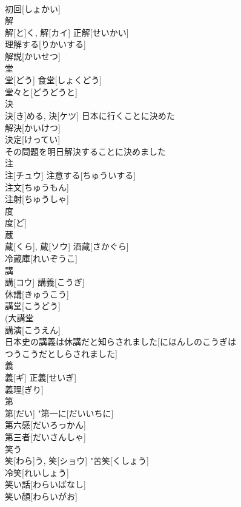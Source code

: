 \documentclass[8pt]{extreport}
\begin{document}
\begin{CJK}{UTF8}{min}
\\	初回[しょかい] 
\\	解	
\\	解[と]く, 解[カイ]	正解[せいかい] 
\\	理解する[りかいする] 
\\	解説[かいせつ] 
\\	堂	
\\	堂[どう]	食堂[しょくどう] 
\\	堂々と[どうどうと] 
\\	決	
\\	決[き]める, 決[ケツ]	日本に行くことに決めた 
\\	解決[かいけつ] 
\\	決定[けってい] 
\\	その問題を明日解決することに決めました 
\\	注	
\\	注[チュウ]	注意する[ちゅういする] 
\\	注文[ちゅうもん] 
\\	注射[ちゅうしゃ] 
\\	度	
\\	度[ど]	
\\	蔵	
\\	蔵[くら], 蔵[ソウ]	酒蔵[さかぐら] 
\\	冷蔵庫[れいぞうこ] 
\\	講	
\\	講[コウ]	講義[こうぎ] 
\\	休講[きゅうこう] 
\\	講堂[こうどう] 
\\	(大講堂 
\\	講演[こうえん] 
\\	日本史の講義は休講だと知らされました[にほんしのこうぎは
\\	つうこうだとしらされました]　
\\	義	
\\	義[ギ]	正義[せいぎ] 
\\	義理[ぎり] 
\\	第	
\\	第[だい]	"第一に[だいいちに] 
\\	第六感[だいろっかん] 
\\	第三者[だいさんしゃ] 
\\	笑う	
\\	笑[わら]う, 笑[ショウ]	"苦笑[くしょう] 
\\	冷笑[れいしょう] 
\\	笑い話[わらいばなし] 
\\	笑い顔[わらいがお] 

\end{CJK}
\end{document}

